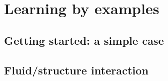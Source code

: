 %
%
%
%
%


\chapter{Learning by examples}
\label{cha:examples}

\section{Getting started: a simple case}
\label{sec:gettingstarted}







\section{Fluid/structure interaction}
\label{sec:gettingstarted}





%
%
